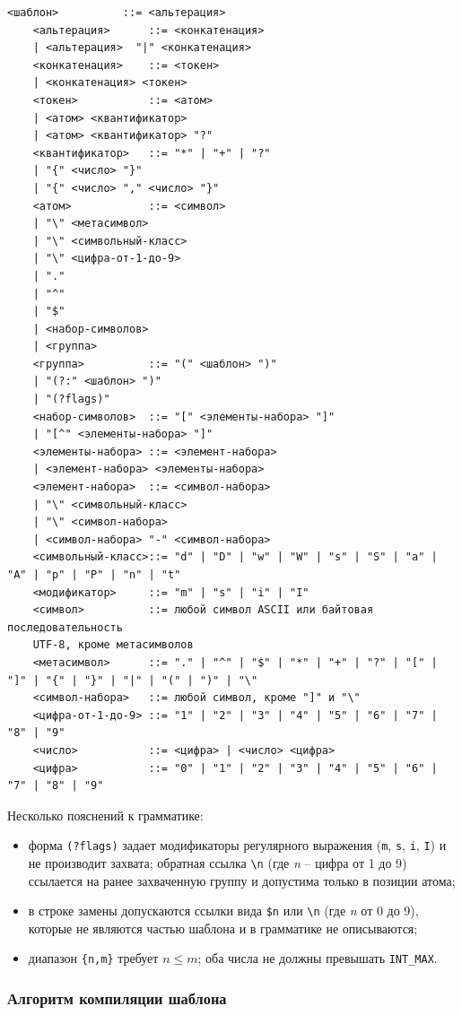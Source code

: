 \begin{lstlisting}[language={},basicstyle=\linespread{1.1}\ttfamily,frame=single,caption={Грамматика шаблона регулярного выражения в форме Бэкуса--Наура}]
	<шаблон>          ::= <альтерация>
	<альтерация>      ::= <конкатенация>
	| <альтерация>  "|" <конкатенация>
	<конкатенация>    ::= <токен>
	| <конкатенация> <токен>
	<токен>           ::= <атом>
	| <атом> <квантификатор>
	| <атом> <квантификатор> "?"
	<квантификатор>   ::= "*" | "+" | "?"
	| "{" <число> "}"
	| "{" <число> "," <число> "}"
	<атом>            ::= <символ>
	| "\" <метасимвол>
	| "\" <символьный-класс>
	| "\" <цифра-от-1-до-9>
	| "."
	| "^"
	| "$"
	| <набор-символов>
	| <группа>
	<группа>          ::= "(" <шаблон> ")"
	| "(?:" <шаблон> ")"
	| "(?flags)"
	<набор-символов>  ::= "[" <элементы-набора> "]"
	| "[^" <элементы-набора> "]"
	<элементы-набора> ::= <элемент-набора>
	| <элемент-набора> <элементы-набора>
	<элемент-набора>  ::= <символ-набора>
	| "\" <символьный-класс>
	| "\" <символ-набора>
	| <символ-набора> "-" <символ-набора>
	<символьный-класс>::= "d" | "D" | "w" | "W" | "s" | "S" | "a" | "A" | "p" | "P" | "n" | "t"
	<модификатор>     ::= "m" | "s" | "i" | "I"
	<символ>          ::= любой символ ASCII или байтовая последовательность
	UTF-8, кроме метасимволов
	<метасимвол>      ::= "." | "^" | "$" | "*" | "+" | "?" | "[" | "]" | "{" | "}" | "|" | "(" | ")" | "\"
	<символ-набора>   ::= любой символ, кроме "]" и "\"
	<цифра-от-1-до-9> ::= "1" | "2" | "3" | "4" | "5" | "6" | "7" | "8" | "9"
	<число>           ::= <цифра> | <число> <цифра>
	<цифра>           ::= "0" | "1" | "2" | "3" | "4" | "5" | "6" | "7" | "8" | "9"
\end{lstlisting}

Несколько пояснений к грамматике:
\begin{itemize}
	\item форма \verb`(?flags)` задает модификаторы регулярного выражения
	(\verb`m`, \verb`s`, \verb`i`, \verb`I`) и не производит захвата;
	обратная ссылка \verb`\n` (где \textit{n} -- цифра от 1 до 9)
	ссылается на ранее захваченную группу и допустима только в позиции атома;
	\item в строке замены допускаются ссылки вида \verb`$n` или \verb`\n`
	(где \textit{n} от 0 до 9), которые не являются частью шаблона
	и в грамматике не описываются;
	\item диапазон \verb`{n,m}` требует $n \leq m$; оба числа не должны
	превышать \verb`INT_MAX`.
\end{itemize}

\subsubsection{Алгоритм компиляции шаблона}


